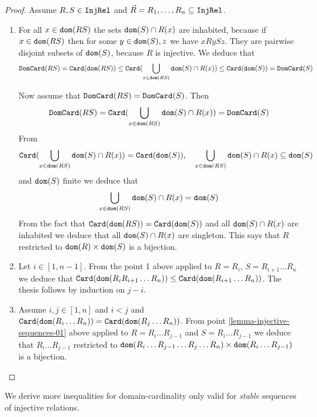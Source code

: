 \documentclass{lmcs}
\begin{document}
\begin{proof}

Assume $R, S \in {\tt InjRel}$ and $\vec{R}=R_1, \ldots, R_n \subseteq {\tt InjRel}$.

\begin{enumerate}

\item
For all $x \in {\tt dom}(RS)$ the sets ${\tt dom}(S) \cap R(x)$ are inhabited,
because if $x \in {\tt dom}(RS)$ then for some $y \in {\tt dom}(S), z$ we have $x R y S z$.
They are pairwise disjoint subsets of ${\tt dom}(S)$, because $R$ is injective. We deduce that 
$$
{\tt DomCard}(RS) = 
{\tt Card}({\tt dom}(RS)) \le
{\tt Card}(\bigcup_{x \in {\tt dom}(RS)} {\tt dom}(S) \cap R(x)) \le 
{\tt Card}({\tt dom}(S)) = 
{\tt DomCard}(S)
$$

Now assume that ${\tt DomCard}(RS) = {\tt DomCard}(S)$. Then 
$$
{\tt DomCard}(RS) = {\tt Card}(\bigcup_{x \in {\tt dom}(RS)} {\tt dom}(S) \cap R(x)) = {\tt DomCard}(S)
$$ 
From 
$$
\Card(\bigcup_{x \in \dom(RS)} \dom(S) \cap R(x)) = \Card(\dom(S)), \ \ \ 
\bigcup_{x \in \dom(RS)} \dom(S) \cap R(x) \subseteq \dom(S)
$$ 
and ${\tt dom}(S)$ finite 
we deduce that $$\bigcup_{x \in {\tt dom}(RS)} {\tt dom}(S) \cap R(x) = {\tt dom}(S)$$ 
From the fact that ${\tt Card}({\tt dom}(RS)) = {\tt Card}({\tt dom}(S))$ and all ${\tt dom}(S) \cap R(x)$ are 
inhabited we deduce that all ${\tt dom}(S) \cap R(x)$ are singleton. 
This says that $R$ restricted to ${\tt dom}(R) \times {\tt dom}(S)$ is a bijection.

\item
Let $i \in [1,n-1]$.
From the point 1 above applied to $R = R_i$, $S = R_{i+1}\ldots R_n$ we deduce that
${\tt Card}({\tt dom}(R_i R_{i+1}\ldots R_n)) \le {\tt Card}({\tt dom}(R_{i+1} \ldots R_n))$. The thesis
follows by induction on $j-i$.

\item
Assume $i, j \in[1,n]$ and $i < j$ and 
${\tt Card}({\tt dom}(R_i \ldots R_n)) = {\tt Card}({\tt dom}(R_j \ldots R_n))$.
From point \ref{lemma-injective-sequences-01} 
above applied to $R = R_i \ldots R_{j-1}$ and $S = R_i \ldots R_{j-1}$ 
we deduce that $R_i \ldots R_{j-1}$ restricted to 
${\tt dom}(R_i \ldots R_{j-1} \ldots R_j \ldots R_n) \times {\tt dom}(R_i \ldots R_{j-1})$
is a bijection.

\end{enumerate}
\end{proof}

We derive more inequalities for domain-cardinality
only valid for \emph{stable} sequences of injective relations. 
\end{document}
